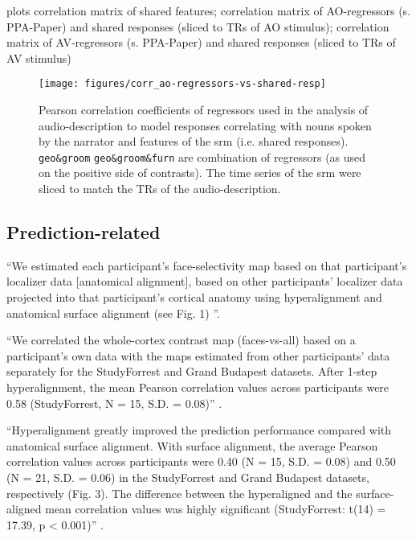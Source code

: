 plots correlation matrix of shared features; correlation matrix of
AO-regressors (s. PPA-Paper) and shared responses (sliced to TRs of AO
stimulus); correlation matrix of AV-regressors (s. PPA-Paper) and shared
responses (sliced to TRs of AV stimulus)




\begin{figure*}[tbp]
\centering
    \texttt{[image: figures/corr\_ao-regressors-vs-shared-resp]}
    \caption{Pearson correlation coefficients of regressors used in the analysis
    of audio-description to model responses correlating with nouns spoken by the
    narrator and features of the \ac{srm} (i.e. shared responses).
    \texttt{geo\&groom} \texttt{geo\&groom\&furn} are combination of regressors
    (as used on the positive side of contrasts). The
    time series of the \ac{srm} were sliced to match the TRs of the
    audio-description.
      }
\label{fig:reg-corr}
\end{figure*}


\subsection{Prediction-related}


``We estimated each participant's face-selectivity map based on that
participant’s localizer data [anatomical alignment], based on other
participants' localizer data projected into that participant's cortical anatomy
using hyperalignment and anatomical surface alignment (see Fig. 1)
\citep{jiahui2020predicting}''.

``We correlated the whole-cortex contrast map (faces-vs-all) based on a
participant’s own data with the maps estimated from other participants’ data
separately for the StudyForrest and Grand Budapest datasets. After 1-step
hyperalignment, the mean Pearson correlation values across participants were
0.58 (StudyForrest, N = 15, S.D. = 0.08)'' \citep{jiahui2020predicting}.

``Hyperalignment greatly improved the prediction performance compared with
anatomical surface alignment. With surface alignment, the average Pearson
correlation values across participants were 0.40 (N = 15, S.D. = 0.08) and 0.50
(N = 21, S.D. = 0.06) in the StudyForrest and Grand Budapest datasets,
respectively (Fig. 3). The difference between the hyperaligned and the
surface-aligned mean correlation values was highly significant (StudyForrest:
t(14) = 17.39, p < 0.001)'' \citep{jiahui2020predicting}.





